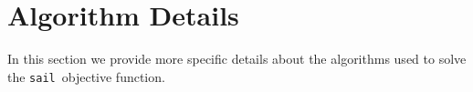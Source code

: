 \documentclass[12pt,letter]{article}\usepackage[]{graphicx}\usepackage[]{color}
\newcommand{\sail}{\texttt{sail}}
\begin{document}



\newpage
%
%



\newpage

\appendix
{}

\section{Algorithm Details} \label{ap:sail_algorithm}

In this section we provide more specific details about the algorithms used to solve the \sail ~objective function. 
\end{document}
